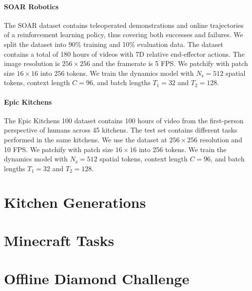 \paragraph{SOAR Robotics}

The SOAR dataset \citep{soar} contains teleoperated demonstrations and online trajectories of a reinforcement learning policy, thus covering both successes and failures.
We split the dataset into 90\% training and 10\% evaluation data.
The dataset contains a total of 180 hours of videos with 7D relative end-effector actions.
The image resolution is $256 \times 256$ and the framerate is 5 FPS.
We patchify with patch size $16 \times 16$ into 256 tokens.
We train the dynamics model with $N_\mathrm{z} = 512$ spatial tokens, context length $C = 96$, and batch lengths $T_1 = 32$ and $T_2 = 128$.

\paragraph{Epic Kitchens}

The Epic Kitchens 100 dataset \citep{epickitchens} contains 100 hours of video from the first-person perspective of humans across 45 kitchens.
The test set contains different tasks performed in the same kitchens.
We use the dataset at $256 \times 256$ resolution and 10 FPS.
We patchify with patch size $16 \times 16$ into 256 tokens.
We train the dynamics model with $N_\mathrm{z} = 512$ spatial tokens, context length $C = 96$, and batch lengths $T_1 = 32$ and $T_2 = 128$.

\clearpage
\section{Kitchen Generations}
\vfill

\vfill

\section{Minecraft Tasks}
\vspace*{-2ex}
\begin{minipage}[t]{0.48\textwidth}

\vspace*{3ex}

\end{minipage}
\hfill%
\begin{minipage}[t]{0.48\textwidth}

\end{minipage}
\clearpage

\section{Offline Diamond Challenge}


\clearpage

